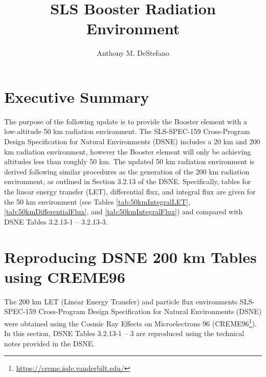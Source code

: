 \documentclass{hitec}
\title{SLS Booster Radiation Environment}
\author{Anthony M. DeStefano}
\begin{document}
\maketitle
{}

\tableofcontents
\listoffigures
\listoftables
\newpage






\cleardoublepage
{}
\section{Executive Summary}

The purpose of the following update is to provide the Booster element with
a low-altitude 50 km radiation environment. The SLS-SPEC-159 Cross-Program Design Specification for Natural Environments (DSNE) includes a 20 km and 200 km radiation environment, however the Booster element will only be achieving altitudes less than roughly 50 km. The updated 50 km radiation environment is derived following similar procedures as the generation of the 200 km radiation environment, as outlined in Section 3.2.13 of the DSNE. Specifically, tables for the linear energy transfer (LET), differential flux, and integral flux are given for the 50 km environment (see Tables \ref{tab:50kmIntegralLET}, \ref{tab:50kmDifferentialFlux}, and \ref{tab:50kmIntegralFlux}) and compared with DSNE Tables 3.2.13-1 -- 3.2.13-3.



\newpage
\section{Reproducing DSNE 200 km Tables using CREME96}

The 200 km LET (Linear Energy Transfer) and particle flux environments SLS-SPEC-159 Cross-Program Design Specification for Natural Environments (DSNE) were obtained using the Cosmic Ray Effects on Microelectrons 96 (CREME96\footnote{\url{https://creme.isde.vanderbilt.edu/}}). In this section, DSNE Tables 3.2.13-1 -- 3 are reproduced using the technical notes provided in the DSNE.
\end{document}

